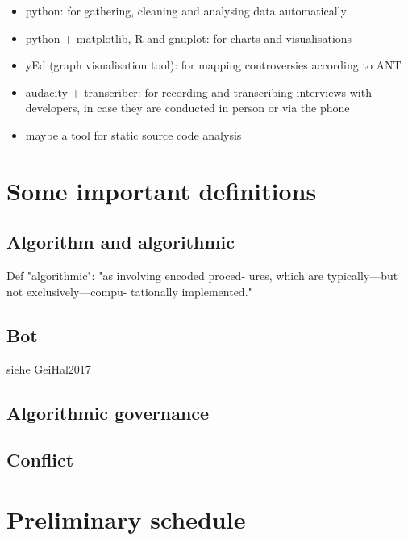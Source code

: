 \documentclass[pdftex,a4paper,11pt]{scrartcl}
\begin{document}
\begin{itemize}
    \item python: for gathering, cleaning and analysing data automatically
    \item python + matplotlib, R and gnuplot: for charts and visualisations
    \item yEd (graph visualisation tool): for mapping controversies according to ANT
    \item audacity + transcriber: for recording and transcribing interviews with developers, in case they are conducted in person or via the phone
    \item maybe a tool for static source code analysis
\end{itemize}

\section{Some important definitions}

\subsection{Algorithm and algorithmic}
Def "algorithmic": "as involving encoded proced-
ures, which are typically—but not exclusively—compu-
tationally implemented."~\cite{Geiger2017}

\subsection{Bot}
siehe GeiHal2017

\subsection{Algorithmic governance}

\subsection{Conflict}

\section{Preliminary schedule}
\end{document}
